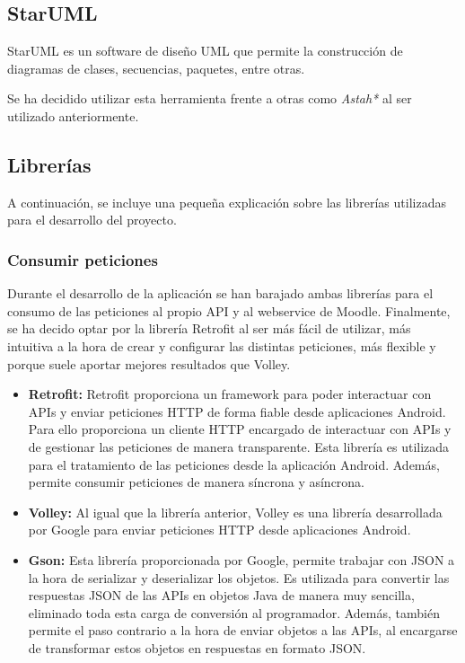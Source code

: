 \subsection{StarUML}

StarUML es un software de diseño UML que permite la construcción de diagramas de clases, secuencias, paquetes, entre otras. \cite{wiki:staruml}

Se ha decidido utilizar esta herramienta frente a otras como \emph{Astah*} \cite{wiki:astah} al ser utilizado anteriormente.

\subsection{Librerías}

A continuación, se incluye una pequeña explicación sobre las librerías utilizadas para el desarrollo del proyecto.

\subsubsection{Consumir peticiones}

Durante el desarrollo de la aplicación se han barajado ambas librerías para el consumo de las peticiones al propio API y al webservice de Moodle. Finalmente, se ha decido optar por la librería Retrofit al ser más fácil de utilizar, más intuitiva a la hora de crear y configurar las distintas peticiones, más flexible y porque suele aportar mejores resultados que Volley.

\begin{itemize}

	\item \textbf{Retrofit:} Retrofit proporciona un framework para poder interactuar con APIs y enviar peticiones HTTP de forma fiable desde aplicaciones Android. Para ello proporciona un cliente HTTP encargado de interactuar con APIs y de gestionar las peticiones de manera transparente.
Esta librería es utilizada para el tratamiento de las peticiones desde la aplicación Android. Además, permite consumir peticiones de manera síncrona y asíncrona. \cite{wiki:retrofit}
	
	\item \textbf{Volley:} Al igual que la librería anterior, Volley es una librería desarrollada por Google para enviar peticiones HTTP desde aplicaciones Android. \cite{wiki:book} \cite{wiki:volley} 
	
	\item \textbf{Gson:} Esta librería proporcionada por Google, permite trabajar con JSON a la hora de serializar y deserializar los objetos. Es utilizada para convertir las respuestas JSON de las APIs en objetos Java de manera muy sencilla, eliminado toda esta carga de conversión al programador. Además, también permite el paso contrario a la hora de enviar objetos a las APIs, al encargarse de transformar estos objetos en respuestas en formato JSON. \cite{wiki:gson}

\end{itemize}

